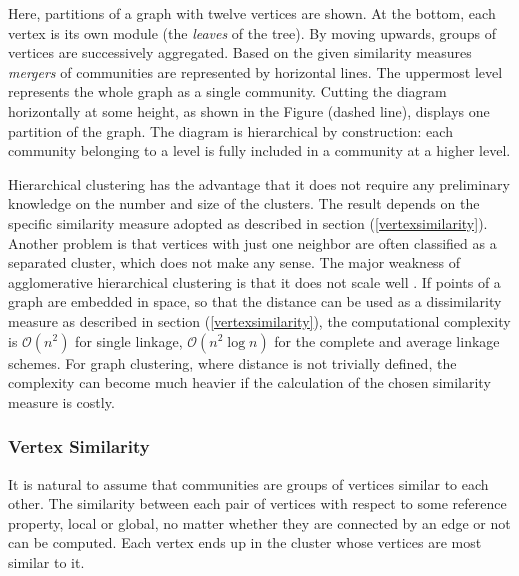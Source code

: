 Here, partitions of a graph with twelve vertices are shown. At the bottom, each vertex is its own module (the \textit{leaves} of the tree). By moving upwards, groups of vertices are successively aggregated. Based on the  given similarity measures \textit{mergers} of communities are represented by horizontal lines. The uppermost level represents the whole graph as a single community. Cutting the diagram horizontally at some height, as shown in the Figure (dashed line), displays one partition of the graph. The diagram is hierarchical by construction: each community belonging to a level is fully included in a community at a higher level.

Hierarchical clustering has the advantage that it does not require any preliminary knowledge on the number and size of the clusters. The result depends on the specific similarity measure adopted as described in section (\ref{vertexsimilarity}). Another problem is that vertices with just one neighbor are often classified as a separated cluster, which does not make any sense. The major weakness of agglomerative hierarchical clustering is that it does not scale well \cite{ref-6}. If points of a graph are embedded in space, so that the distance can be used as a dissimilarity measure as described in section (\ref{vertexsimilarity}), the computational complexity is $\mathcal{O}(n^2)$ for single linkage, $\mathcal{O}(n^2 \log n)$ for the complete and average linkage schemes. For graph clustering, where distance is not trivially defined, the complexity can become much heavier if the calculation of the chosen similarity measure is costly.

\subsubsection*{Vertex Similarity}\label{vertexsimilarity}
It is natural to assume that communities are groups of vertices similar to each other. The similarity between each pair of vertices with respect to some reference property, local or global, no matter whether they are connected by an edge or not can be computed. Each vertex ends up in the cluster whose vertices are most similar to it.

